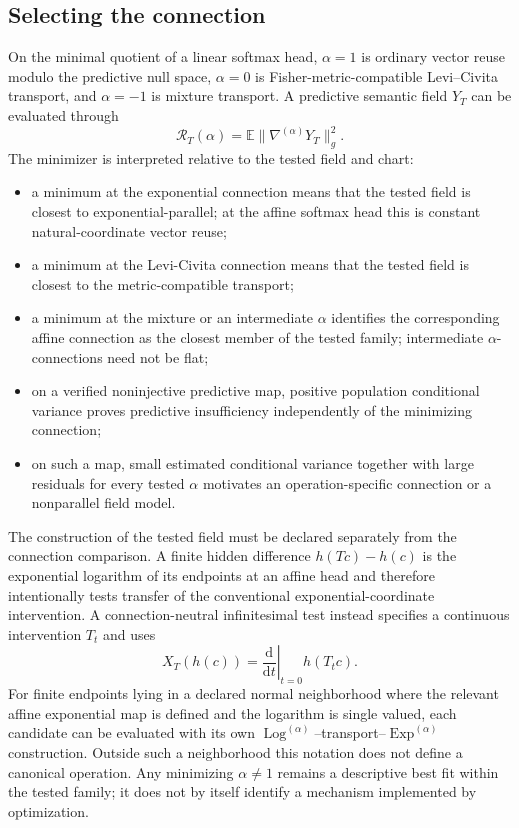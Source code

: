 \documentclass[11pt]{article}
\theoremstyle{definition}
\theoremstyle{remark}
\newcommand{\E}{\mathbb{E}}
\newcommand{\Exp}{\operatorname{Exp}}
\newcommand{\Log}{\operatorname{Log}}
\newcommand{\dd}{\mathrm{d}}
\begin{document}
\subsection{Selecting the connection}

On the minimal quotient of a linear softmax head, $\alpha=1$ is ordinary
vector reuse modulo the predictive null space, $\alpha=0$ is
Fisher-metric-compatible Levi--Civita transport, and $\alpha=-1$ is mixture
transport. A predictive semantic field $Y_T$ can be evaluated through
\begin{equation}
    \mathcal R_T(\alpha)=\E\|\nabla^{(\alpha)}Y_T\|_g^2.
\end{equation}
The minimizer is interpreted relative to the tested field and chart:
\begin{itemize}[leftmargin=*]
    \item a minimum at the exponential connection means that the tested field is closest to exponential-parallel; at the affine softmax head this is constant natural-coordinate vector reuse;
    \item a minimum at the Levi-Civita connection means that the tested field is closest to the metric-compatible transport;
    \item a minimum at the mixture or an intermediate $\alpha$ identifies the corresponding affine connection as the closest member of the tested family; intermediate $\alpha$-connections need not be flat;
    \item on a verified noninjective predictive map, positive population conditional variance proves predictive insufficiency independently of the minimizing connection;
    \item on such a map, small estimated conditional variance together with large residuals for every tested $\alpha$ motivates an operation-specific connection or a nonparallel field model.
\end{itemize}

The construction of the tested field must be declared separately from the connection comparison. A finite hidden difference $h(Tc)-h(c)$ is the exponential logarithm of its endpoints at an affine head and therefore intentionally tests transfer of the conventional exponential-coordinate intervention. A connection-neutral infinitesimal test instead specifies a continuous intervention $T_t$ and uses
\begin{equation}
    X_T(h(c))=\left.\frac{\dd}{\dd t}\right|_{t=0}h(T_t c).
\end{equation}
For finite endpoints lying in a declared normal neighborhood where the relevant
affine exponential map is defined and the logarithm is single valued, each
candidate can be evaluated with its own
$\Log^{(\alpha)}$--transport--$\Exp^{(\alpha)}$ construction. Outside such a
neighborhood this notation does not define a canonical operation. Any
minimizing $\alpha\ne1$ remains a descriptive best fit within the tested
family; it does not by itself identify a mechanism implemented by optimization.
\end{document}
